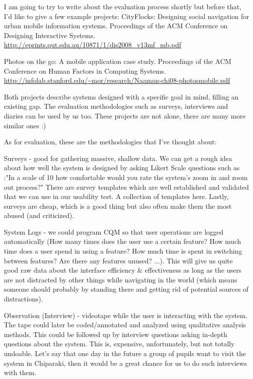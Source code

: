 \documentclass{article}
\begin{document}
I am going to try to write about the evaluation process shortly but before that, I'd like to give a few example projects:
CityFlocks: Designing social navigation for urban mobile information systems. Proceedings of the ACM Conference on Designing Interactive Systems. \url{http://eprints.qut.edu.au/10871/1/dis2008_v13mf_mb.pdf}

Photos on the go: A mobile application case study. Proceedings of the ACM Conference on Human Factors in Computing Systems. \url{http://infolab.stanford.edu/~mor/research/Naaman-chi08-photosmobile.pdf}

Both projects describe systems designed with a specific goal in mind, filling an existing gap. The evaluation methodologies such as surveys, interviews and diaries can be used by us too. These projects are not alone, there are many more similar ones :)

As for evaluation, these are the methodologies that I've thought about:

Surveys - good for gathering massive, shallow data. We can get a rough idea about how well the system is designed by asking Likert Scale questions such as :"In a scale of 10 how comfortable would you rate the system's zoom in and zoom out process?" There are survey templates which are well established and validated that we can use in our usability test. A collection of templates here.
Lastly, surveys are cheap, which is a good thing but also often make them the most abused (and criticized).

System Logs - we could program CQM so that user operations are logged automatically (How many times does the user use a certain feature? How much time does a user spend in using a feature? How much time is spent in switching between features? Are there any features unused? ...). This will give us quite good raw data about the interface efficiency \& effectiveness as long as the users are not distracted by other things while navigating in the world (which means someone should probably by standing there and getting rid of potential sources of distractions).

Observation (Interview) - videotape while the user is interacting with the system. The tape could later be coded/annotated and analyzed using qualitative analysis methods. This could be followed up by interview questions asking in-depth questions about the system. This is, expensive, unfortunately, but not totally undoable. Let's say that one day in the future a group of pupils want to visit the system in Chiparaki, then it would be a great chance for us to do such interviews with them. 
\end{document}
